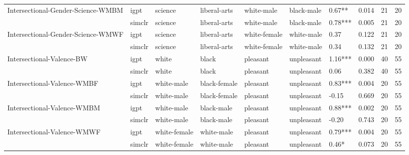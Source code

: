 \begin{tabular}{llllllllll}
Intersectional-Gender-Science-WMBM & igpt &       science &  liberal-arts &    white-male &    black-male &   0.67** &  0.014 &    21 &    20 \\
                            & simclr &       science &  liberal-arts &    white-male &    black-male &  0.78*** &  0.005 &    21 &    20 \\
Intersectional-Gender-Science-WMWF & igpt &       science &  liberal-arts &  white-female &    white-male &     0.37 &  0.122 &    21 &    20 \\
                            & simclr &       science &  liberal-arts &  white-female &    white-male &     0.34 &  0.132 &    21 &    20 \\
Intersectional-Valence-BW & igpt &         white &         black &      pleasant &    unpleasant &  1.16*** &  0.000 &    40 &    55 \\
                            & simclr &         white &         black &      pleasant &    unpleasant &     0.06 &  0.382 &    40 &    55 \\
Intersectional-Valence-WMBF & igpt &    white-male &  black-female &      pleasant &    unpleasant &  0.83*** &  0.004 &    20 &    55 \\
                            & simclr &    white-male &  black-female &      pleasant &    unpleasant &    -0.15 &  0.669 &    20 &    55 \\
Intersectional-Valence-WMBM & igpt &    white-male &    black-male &      pleasant &    unpleasant &  0.88*** &  0.002 &    20 &    55 \\
                            & simclr &    white-male &    black-male &      pleasant &    unpleasant &    -0.20 &  0.743 &    20 &    55 \\
Intersectional-Valence-WMWF & igpt &  white-female &    white-male &      pleasant &    unpleasant &  0.79*** &  0.004 &    20 &    55 \\
                            & simclr &  white-female &    white-male &      pleasant &    unpleasant &    0.46* &  0.073 &    20 &    55 \\
\bottomrule
\end{tabular}
